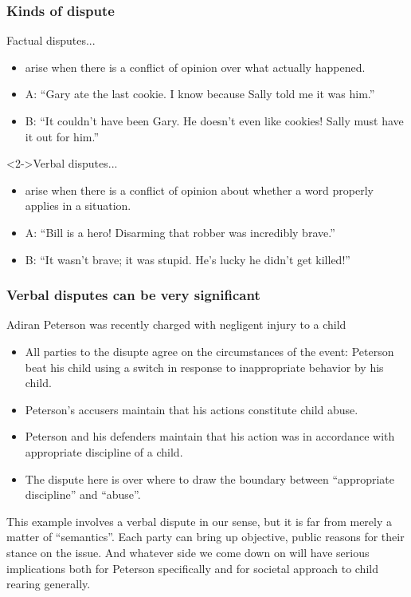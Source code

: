 \documentclass[10pt,letterpaper,xcolor=dvipsnames,handout]{beamer}
\begin{document}
\begin{frame}
  \frametitle{Kinds of dispute}
  
  \begin{block}{Factual disputes...}
    \begin{itemize}
      \item arise when there is a conflict of opinion over what actually happened.
      \item A: ``Gary ate the last cookie.  I know because Sally told me it was him.''
      \item B: ``It couldn't have been Gary. He doesn't even like cookies!  Sally must have it out for him.''
    \end{itemize}
  \end{block}
  
  \begin{block}<2->{Verbal disputes...}
    \begin{itemize}
      \item arise when there is a conflict of opinion about whether a word properly applies in a situation.
      \item A: ``Bill is a hero! Disarming that robber was incredibly brave.''
      \item B: ``It wasn't brave; it was stupid.  He's lucky he didn't get killed!''
    \end{itemize}
  \end{block}
  
\end{frame}

\begin{frame}
  \frametitle{Verbal disputes can be very significant}
  
  \begin{block}{Adiran Peterson was recently charged with negligent injury to a child}
  \begin{itemize}
    \item All parties to the disupte agree on the circumstances of the event: Peterson beat his child using a switch in response to inappropriate behavior by his child.
    \item Peterson's accusers maintain that his actions constitute child abuse.
    \item Peterson and his defenders maintain that his action was in accordance with appropriate discipline of a child.
    \item The dispute here is over where to draw the boundary between ``appropriate discipline'' and ``abuse''.
  \end{itemize}
  \end{block}

This example involves a verbal dispute in our sense, but it is far from merely a matter of ``semantics''.  Each party can bring up objective, public reasons for their stance on the issue.  And whatever side we come down on will have serious implications both for Peterson specifically and for societal approach to child rearing generally.

\end{frame}
\end{document}
